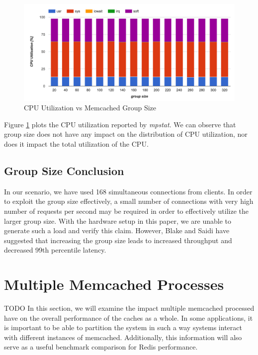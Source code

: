 \begin{figure}[h]
    \includegraphics[width=\textwidth]{./res2/m_group_size_cpu.png}
    \caption{CPU Utilization vs Memcached Group Size}
    \label{fig:m_group_size_cpu}
\end{figure}

Figure \ref{fig:m_group_size_cpu} plots the CPU utilization reported by \textit{mpstat}. We can observe that group size does not have any impact on the distribution of CPU utilization, nor does it impact the total utilization of the CPU.

\subsection{Group Size Conclusion}

In our scenario, we have used 168 simultaneous connections from clients. In order to exploit the group size effectively, a small number of connections with very high number of requests per second may be required in order to effectively utilize the larger group size. With the hardware setup in this paper, we are unable to generate such a load and verify this claim. However, Blake and Saidi \cite{blake54does} have suggested that increasing the group size leads to increased throughput and decreased 99th percentile latency.

\section{Multiple Memcached Processes}
TODO
In this section, we will examine the impact multiple memcached processed have on the overall performance of the caches as a whole. In some applications, it is important to be able to partition the system in such a way systems interact with different instances of memcached. Additionally, this information will also serve as a useful benchmark comparison for Redis performance.